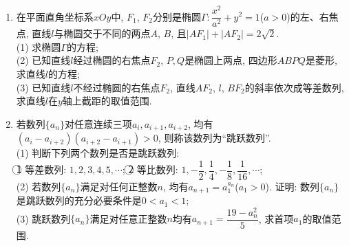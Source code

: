 \documentclass[10pt,a4paper]{article}
\begin{document}
\begin{enumerate}[1.]
(1) 判断使用参数$b=12$是否满足条件, 并说明理由;\\
(2) 求同时满足条件\textcircled{1}、\textcircled{2}的参数$b$的取值范围.
\item 在平面直角坐标系$xOy$中, $F_1$, $F_2$分别是椭圆$\Gamma :\dfrac{x^2}{a^2}+y^2=1$($a>0$)的左、右焦点, 直线$l$与椭圆交于不同的两点$A$, $B$, 且$|AF_1|+|AF_2|=2\sqrt 2$.\\
(1) 求椭圆$\Gamma$的方程;\\
(2) 已知直线$l$经过椭圆的右焦点$F_2$, $P,Q$是椭圆上两点, 四边形$ABPQ$是菱形, 求直线$l$的方程;\\
(3) 已知直线$l$不经过椭圆的右焦点$F_2$, 直线$AF_2$, $l$, $BF_2$的斜率依次成等差数列, 求直线$l$在$y$轴上截距的取值范围.
\item 若数列$\{a_n\}$对任意连续三项$a_i,a_{i+1},a_{i+2}$, 均有$(a_i-a_{i+2})(a_{i+2}-a_{i+1})>0$, 则称该数列为``跳跃数列''.\\
(1) 判断下列两个数列是否是跳跃数列:\\
\textcircled{1} 等差数列: $1,2,3,4,5,\cdots$; \textcircled{2} 等比数列: $1,-\dfrac 12,\dfrac 14,-\dfrac 18,\dfrac 1{16},\cdots$;\\
(2) 若数列$\{a_n\}$满足对任何正整数$n$, 均有$a_{n+1}=a_1^{a_n}$($a_1>0$). 证明: 数列$\{a_n\}$是跳跃数列的充分必要条件是$0<a_1<1$;\\
(3) 跳跃数列$\{a_n\}$满足对任意正整数$n$均有$a_{n+1}=\dfrac{19-a_n^2}5$, 求首项$a_1$的取值范围.


\end{enumerate}
\end{document}
